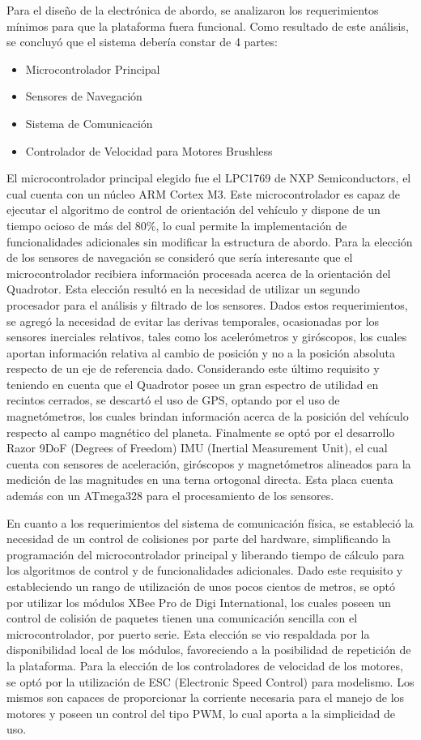 \documentclass[a4paper, conference]{IEEEtran}
\begin{document}
Para el diseño de la electrónica de abordo, se analizaron los requerimientos mínimos para que la plataforma fuera funcional. Como resultado de este análisis, se concluyó que el sistema debería constar de 4 partes: 
\begin{itemize}
\item Microcontrolador Principal
\item Sensores de Navegación 
\item Sistema de Comunicación
\item Controlador de Velocidad para Motores Brushless
\end{itemize}
	
El microcontrolador principal elegido fue el LPC1769 de NXP Semiconductors, el cual cuenta con un núcleo ARM Cortex M3.  Este microcontrolador es capaz de ejecutar el algoritmo de control de orientación del vehículo y dispone de un tiempo ocioso de más del 80\%, lo cual permite la implementación de funcionalidades  adicionales sin modificar la estructura de abordo.
Para la elección de los sensores de navegación se consideró que sería interesante que el microcontrolador recibiera información procesada acerca de la orientación del Quadrotor. Esta elección resultó en la necesidad de utilizar un segundo procesador para el análisis y filtrado de los sensores. Dados estos requerimientos, se agregó la necesidad de evitar las derivas temporales, ocasionadas por los sensores inerciales relativos, tales como los acelerómetros y giróscopos, los cuales aportan información relativa al cambio de posición y no a la posición absoluta respecto de un eje de referencia dado. Considerando este último requisito y teniendo en cuenta que el Quadrotor posee un gran espectro de utilidad en recintos cerrados, se descartó el uso de GPS, optando por el uso de magnetómetros, los cuales brindan información acerca de la posición del vehículo respecto al campo magnético del planeta. Finalmente se optó por el desarrollo Razor 9DoF (Degrees of Freedom) IMU (Inertial Measurement Unit), el cual cuenta con sensores de aceleración, giróscopos y magnetómetros alineados para la medición de las magnitudes en una terna ortogonal directa. Esta placa cuenta además con un ATmega328 para el procesamiento de los sensores.

En cuanto a los requerimientos del sistema de comunicación física, se estableció la necesidad de un control de colisiones por parte del hardware, simplificando la programación del microcontrolador principal y liberando tiempo de cálculo para los algoritmos de control y de funcionalidades adicionales. Dado este requisito y estableciendo un rango de utilización de unos pocos cientos de metros, se optó por utilizar los módulos XBee Pro de Digi International, los cuales poseen un control de colisión de paquetes tienen una comunicación sencilla con el microcontrolador, por puerto serie. Esta elección se vio respaldada por la disponibilidad local de los módulos, favoreciendo a la posibilidad de repetición de la plataforma.
Para la elección de los controladores de velocidad de los motores, se optó por la utilización de ESC (Electronic Speed Control) para modelismo. Los mismos son capaces de proporcionar la corriente necesaria para el manejo de los motores y poseen un control del tipo PWM, lo cual aporta a la simplicidad de uso. 
\end{document}
